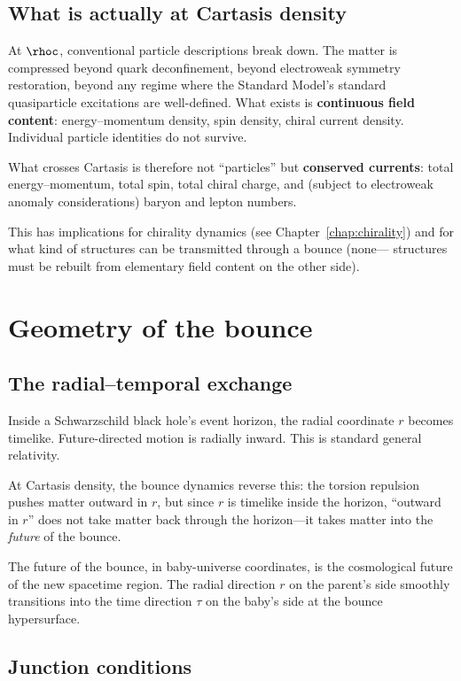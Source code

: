 \subsection{What is actually at Cartasis density}

At $\rhoc$, conventional particle descriptions break down. The matter is
compressed beyond quark deconfinement, beyond electroweak symmetry restoration,
beyond any regime where the Standard Model's standard quasiparticle excitations
are well-defined. What exists is \textbf{continuous field content}:
energy--momentum density, spin density, chiral current density. Individual
particle identities do not survive.

What crosses Cartasis is therefore not ``particles'' but \textbf{conserved
currents}: total energy--momentum, total spin, total chiral charge, and
(subject to electroweak anomaly considerations) baryon and lepton numbers.

This has implications for chirality dynamics (see Chapter~\ref{chap:chirality})
and for what kind of structures can be transmitted through a bounce (none---
structures must be rebuilt from elementary field content on the other side).

\section{Geometry of the bounce}

\subsection{The radial--temporal exchange}

Inside a Schwarzschild black hole's event horizon, the radial coordinate $r$
becomes timelike. Future-directed motion is radially inward. This is standard
general relativity.

At Cartasis density, the bounce dynamics reverse this: the torsion repulsion
pushes matter outward in $r$, but since $r$ is timelike inside the horizon,
``outward in $r$'' does not take matter back through the horizon---it takes
matter into the \emph{future} of the bounce.

The future of the bounce, in baby-universe coordinates, is the cosmological
future of the new spacetime region. The radial direction $r$ on the parent's
side smoothly transitions into the time direction $\tau$ on the baby's side at
the bounce hypersurface.

\subsection{Junction conditions}

